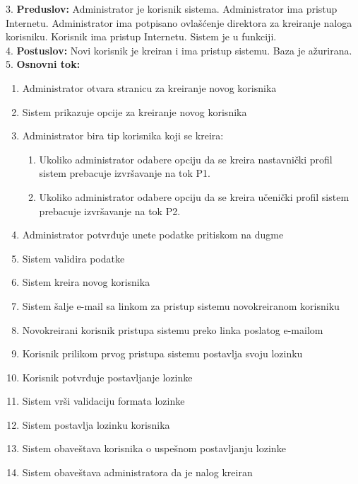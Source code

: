 \documentclass{article}
\begin{document}
3. \textbf{Preduslov:} Administrator je korisnik sistema. Administrator ima pristup Internetu. Administrator ima potpisano ovlašćenje direktora za kreiranje naloga korisniku. Korisnik ima pristup Internetu. Sistem je u funkciji. \\

4. \textbf{Postuslov:} Novi korisnik je kreiran i ima pristup sistemu. Baza je ažurirana. \\

5. \textbf{Osnovni tok:} 
\begin{enumerate} [label=(\alph*)]
\item Administrator otvara stranicu za kreiranje novog korisnika
\item Sistem prikazuje opcije za kreiranje novog korisnika
\item Administrator bira tip korisnika koji se kreira:
\begin{enumerate} [label=(\roman*)]
    \item Ukoliko administrator odabere opciju da se kreira nastavnički profil sistem prebacuje izvršavanje na tok P1.
    \item Ukoliko administrator odabere opciju da se kreira učenički profil sistem prebacuje izvršavanje na tok P2.
\end{enumerate}
\item Administrator potvrđuje unete podatke pritiskom na dugme
\item Sistem validira podatke
\item Sistem kreira novog korisnika
\item Sistem šalje e-mail sa linkom za pristup sistemu novokreiranom korisniku
\item Novokreirani korisnik pristupa sistemu preko linka poslatog e-mailom
\item Korisnik prilikom prvog pristupa sistemu postavlja svoju lozinku
\item Korisnik potvrđuje postavljanje lozinke
\item Sistem vrši validaciju formata lozinke
\item Sistem postavlja lozinku korisnika
\item Sistem obaveštava korisnika o uspešnom postavljanju lozinke
\item Sistem obaveštava administratora da je nalog kreiran
\end{enumerate}
\end{document}
